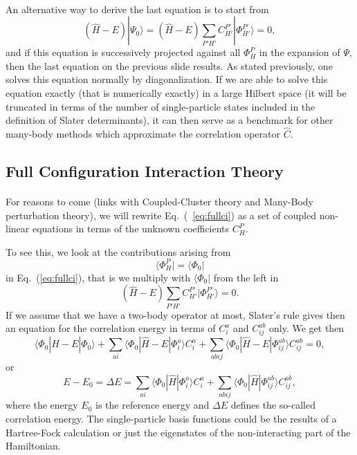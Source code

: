 \documentclass[%
twoside,                 %
final,                   %
10pt]{article}
\begin{document}
\paragraph{}
An alternative way to derive the last equation is to start from 
\[
(\hat{H} -E)|\Psi_0\rangle = (\hat{H} -E)\sum_{P'H'}C_{H'}^{P'}|\Phi_{H'}^{P'} \rangle=0, 
\]
and if this equation is successively projected against all $\Phi_H^P$ in the expansion of $\Psi$, then the last equation on the previous slide
results.   As stated previously, one solves this equation normally by diagonalization. If we are able to solve this equation exactly (that is
numerically exactly) in a large Hilbert space (it will be truncated in terms of the number of single-particle states included in the definition
of Slater determinants), it can then serve as a benchmark for other many-body methods which approximate the correlation operator
$\hat{C}$.



\subsection{Full Configuration Interaction Theory}

\paragraph{}
For reasons to come (links with Coupled-Cluster theory and Many-Body perturbation theory), 
we will rewrite Eq.~(~\ref{eq:fullci}) as a set of coupled non-linear equations in terms of the unknown coefficients $C_H^P$. 

To see this, we look at the contributions arising from 
\[
\langle \Phi_H^P | = \langle \Phi_0|
\]
in  Eq.~(\ref{eq:fullci}), that is we multiply with $\langle \Phi_0 |$
from the left in 
\[
(\hat{H} -E)\sum_{P'H'}C_{H'}^{P'}|\Phi_{H'}^{P'} \rangle=0. 
\]
If we assume that we have a two-body operator at most, Slater's rule gives then an equation for the 
correlation energy in terms of $C_i^a$ and $C_{ij}^{ab}$ only.  We get then
\[
\langle \Phi_0 | \hat{H} -E| \Phi_0\rangle + \sum_{ai}\langle \Phi_0 | \hat{H} -E|\Phi_{i}^{a} \rangle C_{i}^{a}+
\sum_{abij}\langle \Phi_0 | \hat{H} -E|\Phi_{ij}^{ab} \rangle C_{ij}^{ab}=0,
\]
or 
\[
E-E_0 =\Delta E=\sum_{ai}\langle \Phi_0 | \hat{H}|\Phi_{i}^{a} \rangle C_{i}^{a}+
\sum_{abij}\langle \Phi_0 | \hat{H}|\Phi_{ij}^{ab} \rangle C_{ij}^{ab},
\]
where the energy $E_0$ is the reference energy and $\Delta E$ defines the so-called correlation energy.
The single-particle basis functions  could be the results of a Hartree-Fock calculation or just the eigenstates of the non-interacting part of the Hamiltonian. 
\end{document}
